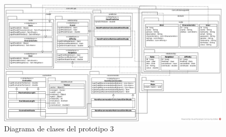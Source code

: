   \begin{landscape}
    \begin{figure}[h!]
      \centering
      \includegraphics[width=25cm]{./images/p3_classes}
      \caption{Diagrama de clases del prototipo 3}
      \label{fig:p3_classes}
    \end{figure}
  \end{landscape}




